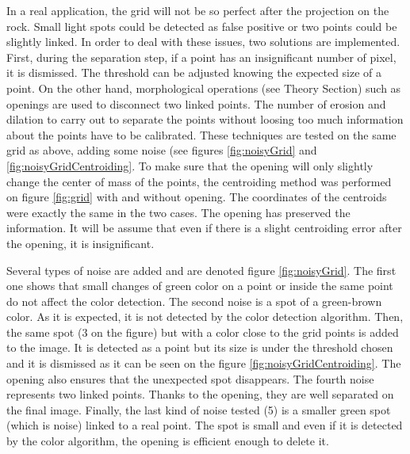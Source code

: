In a real application, the grid will not be so perfect after the projection on the rock. Small light spots could be detected as false positive or two points could be slightly linked. In order to deal with these issues, two solutions are implemented. First, during the separation step, if a point has an insignificant number of pixel, it is dismissed. The threshold can be adjusted knowing the expected size of a point. On the other hand, morphological operations (see Theory Section) such as openings are used to disconnect two linked points. The number of erosion and dilation to carry out to separate the points without loosing too much information about the points have to be calibrated. These techniques are tested on the same grid as above, adding some noise (see figures \ref{fig:noisyGrid} and \ref{fig:noisyGridCentroiding}. To make sure that the opening will only slightly change the center of mass of the points, the centroiding method was performed on figure \ref{fig:grid} with and without opening. The coordinates of the centroids were exactly the same in the two cases. The opening has preserved the information. It will be assume that even if there is a slight centroiding error after the opening, it is insignificant.

Several types of noise are added and are denoted figure \ref{fig:noisyGrid}. The first one shows that small changes of green color on a point or inside the same point do not affect the color detection. The second noise is a spot of a green-brown color. As it is expected, it is not detected by the color detection algorithm. Then, the same spot (3 on the figure) but with a color close to the grid points is added to the image. It is detected as a point but its size is under the threshold chosen and it is dismissed as it can be seen on the figure \ref{fig:noisyGridCentroiding}. The opening also ensures that the unexpected spot disappears. The fourth noise represents two linked points. Thanks to the opening, they are well separated on the final image. Finally, the last kind of noise tested (5) is a smaller green spot (which is noise) linked to a real point. The spot is small and even if it is detected by the color algorithm, the opening is efficient enough to delete it. 

